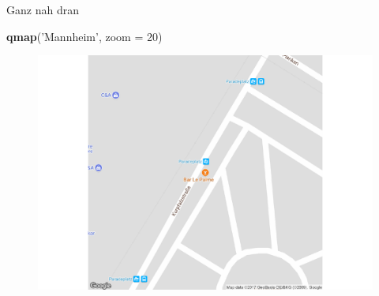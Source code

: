 \documentclass[ignorenonframetext,]{beamer}
\newenvironment{Shaded}{}{}
\newcommand{\KeywordTok}[1]{\textcolor[rgb]{0.00,0.44,0.13}{\textbf{{#1}}}}
\newcommand{\DataTypeTok}[1]{\textcolor[rgb]{0.56,0.13,0.00}{{#1}}}
\newcommand{\DecValTok}[1]{\textcolor[rgb]{0.25,0.63,0.44}{{#1}}}
\newcommand{\StringTok}[1]{\textcolor[rgb]{0.25,0.44,0.63}{{#1}}}
\newcommand{\NormalTok}[1]{{#1}}
\begin{document}
\begin{frame}[fragile]{Ganz nah dran}

\begin{Shaded}
\begin{Highlighting}[]
\KeywordTok{qmap}\NormalTok{(}\StringTok{'Mannheim'}\NormalTok{, }\DataTypeTok{zoom =} \DecValTok{20}\NormalTok{)}
\end{Highlighting}
\end{Shaded}

\begin{figure}[htbp]
\centering
\includegraphics{RSocialScience2_files/figure-beamer/unnamed-chunk-36-1.pdf}
\caption{}
\end{figure}

\end{frame}
\end{document}
